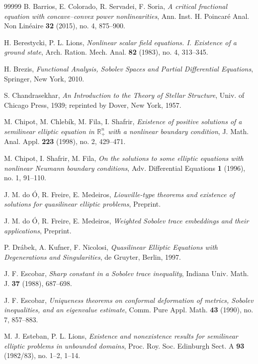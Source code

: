 \documentclass[12pt,reqno]{amsart}
\begin{document}
\begin{thebibliography}{99999}
 B. Barrios, E. Colorado, R. Servadei, F. Soria, \textit{A critical fractional equation with concave–convex power nonlinearities}, Ann. Inst. H. Poincaré Anal. Non Linéaire \textbf{32} (2015), no. 4, 875–900.

 H. Berestycki, P. L. Lions, \textit{Nonlinear scalar field equations. I. Existence of a ground state}, Arch. Ration. Mech. Anal. \textbf{82} (1983), no. 4, 313–345.

 H. Brezis, \textit{Functional Analysis, Sobolev Spaces and Partial Differential Equations}, Springer, New York, 2010.

 S. Chandrasekhar, \textit{An Introduction to the Theory of Stellar Structure}, Univ. of Chicago Press, 1939; reprinted by Dover, New York, 1957.

 M. Chipot, M. Chlebík, M. Fila, I. Shafrir, \textit{Existence of positive solutions of a semilinear elliptic equation in \(\mathds{R}^n_+\) with a nonlinear boundary condition}, J. Math. Anal. Appl. \textbf{223} (1998), no. 2, 429–471.

 M. Chipot, I. Shafrir, M. Fila, \textit{On the solutions to some elliptic equations with nonlinear Neumann boundary conditions}, Adv. Differential Equations \textbf{1} (1996), no. 1, 91–110.

 J. M. do Ó, R. Freire, E. Medeiros, \textit{Liouville-type theorems and existence of solutions for quasilinear elliptic problems}, Preprint.

 J. M. do Ó, R. Freire, E. Medeiros, \textit{Weighted Sobolev trace embeddings and their applications}, Preprint.

 P. Drábek, A. Kufner, F. Nicolosi, \textit{Quasilinear Elliptic Equations with Degenerations and Singularities}, de Gruyter, Berlin, 1997.

 J. F. Escobar, \textit{Sharp constant in a Sobolev trace inequality}, Indiana Univ. Math. J. \textbf{37} (1988), 687–698.

 J. F. Escobar, \textit{Uniqueness theorems on conformal deformation of metrics, Sobolev inequalities, and an eigenvalue estimate}, Comm. Pure Appl. Math. \textbf{43} (1990), no. 7, 857–883.

 M. J. Esteban, P. L. Lions, \textit{Existence and nonexistence results for semilinear elliptic problems in unbounded domains}, Proc. Roy. Soc. Edinburgh Sect. A \textbf{93} (1982/83), no. 1–2, 1–14.


\end{thebibliography}
\end{document}
